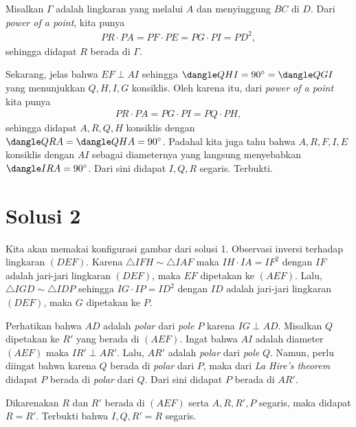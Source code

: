     Misalkan $\Gamma$ adalah lingkaran yang melalui $A$ dan menyinggung $BC$ di $D$. Dari \textit{power of a point}, kita punya
    \begin{align*}
        PR \cdot PA = PF \cdot PE = PG \cdot PI = PD^2,
    \end{align*}
    sehingga didapat $R$ berada di $\Gamma$.

    Sekarang, jelas bahwa $EF \perp AI$ sehingga $\dangle QHI = 90^\circ = \dangle QGI$ yang menunjukkan $Q,H,I,G$ konsiklis. Oleh karena itu, dari \textit{power of a point} kita punya
    \begin{align*}
        PR \cdot PA = PG \cdot PI = PQ \cdot PH,
    \end{align*}
    sehingga didapat $A,R,Q,H$ konsiklis dengan $\dangle QRA = \dangle QHA = 90^\circ$. 
    Padahal kita juga tahu bahwa $A,R,F,I,E$ konsiklis dengan $AI$ sebagai diameternya yang langsung menyebabkan $\dangle IRA = 90^\circ$. Dari sini didapat $I,Q,R$ segaris. Terbukti.

\section{Solusi 2}
    Kita akan memakai konfigurasi gambar dari solusi 1. Observasi inversi terhadap lingkaran $(DEF)$. 
    Karena $\triangle IFH \sim \triangle IAF$ maka $IH \cdot IA = IF^2$ dengan $IF$ adalah jari-jari lingkaran $(DEF)$, maka $EF$ dipetakan ke $(AEF)$.
    Lalu, $\triangle IGD \sim \triangle IDP$ sehingga $IG \cdot IP = ID^2$ dengan $ID$ adalah jari-jari lingkaran $(DEF)$, maka $G$ dipetakan ke $P$.

    Perhatikan bahwa $AD$ adalah \textit{polar} dari \textit{pole} $P$ karena $IG \perp AD$.
    Misalkan $Q$ dipetakan ke $R'$ yang berada di $(AEF)$. Ingat bahwa $AI$ adalah diameter $(AEF)$ maka $IR' \perp AR'$. 
    Lalu, $AR'$ adalah \textit{polar} dari \textit{pole} $Q$. 
    Namun, perlu diingat bahwa karena $Q$ berada di \textit{polar} dari $P$, maka dari \textit{La Hire's theorem} didapat $P$ berada di \textit{polar} dari $Q$. Dari sini didapat $P$ berada di $AR'$.

    Dikarenakan $R$ dan $R'$ berada di $(AEF)$ serta $A,R,R',P$ segaris, maka didapat $R=R'$. Terbukti bahwa $I,Q,R'=R$ segaris.




